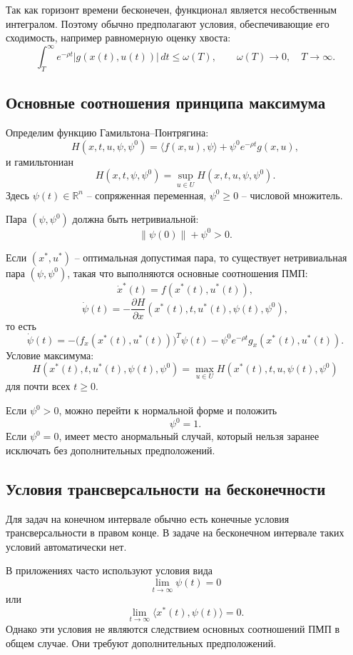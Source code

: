 \documentclass[12pt,a4paper]{article}
\newcommand{\R}{\mathbb{R}}
\begin{document}
Так как горизонт времени бесконечен, функционал является несобственным интегралом. Поэтому обычно предполагают условия, обеспечивающие его сходимость, например равномерную оценку хвоста:
\[
    \int_T^\infty e^{-\rho t}|g(x(t),u(t))|\,dt\le\omega(T),
    \qquad
    \omega(T)\to0,
    \quad T\to\infty.
\]

\subsection{Основные соотношения принципа максимума}

Определим функцию Гамильтона--Понтрягина:
\[
    H(x,t,u,\psi,\psi^0)
    =\langle f(x,u),\psi\rangle+\psi^0e^{-\rho t}g(x,u),
\]
и гамильтониан
\[
    H(x,t,\psi,\psi^0)=\sup_{u\in U}H(x,t,u,\psi,\psi^0).
\]
Здесь \(\psi(t)\in\R^n\) -- сопряженная переменная, \(\psi^0\ge0\) -- числовой множитель.

Пара \((\psi,\psi^0)\) должна быть нетривиальной:
\[
    \|\psi(0)\|+\psi^0>0.
\]

Если \((x^*,u^*)\) -- оптимальная допустимая пара, то существует нетривиальная пара \((\psi,\psi^0)\), такая что выполняются основные соотношения ПМП:
\[
    \dot x^*(t)=f(x^*(t),u^*(t)),
\]
\[
    \dot\psi(t)=-\frac{\partial H}{\partial x}
    (x^*(t),t,u^*(t),\psi(t),\psi^0),
\]
то есть
\[
    \dot\psi(t)
    =-\bigl(f_x(x^*(t),u^*(t))\bigr)^T\psi(t)
    -\psi^0e^{-\rho t}g_x(x^*(t),u^*(t)).
\]
Условие максимума:
\[
    H(x^*(t),t,u^*(t),\psi(t),\psi^0)
    =\max_{u\in U}H(x^*(t),t,u,\psi(t),\psi^0)
\]
для почти всех \(t\ge0\).

Если \(\psi^0>0\), можно перейти к нормальной форме и положить
\[
    \psi^0=1.
\]
Если \(\psi^0=0\), имеет место анормальный случай, который нельзя заранее исключать без дополнительных предположений.

\subsection{Условия трансверсальности на бесконечности}

Для задач на конечном интервале обычно есть конечные условия трансверсальности в правом конце. В задаче на бесконечном интервале таких условий автоматически нет.

В приложениях часто используют условия вида
\[
    \lim_{t\to\infty}\psi(t)=0
\]
или
\[
    \lim_{t\to\infty}\langle x^*(t),\psi(t)\rangle=0.
\]
Однако эти условия не являются следствием основных соотношений ПМП в общем случае. Они требуют дополнительных предположений.
\end{document}
